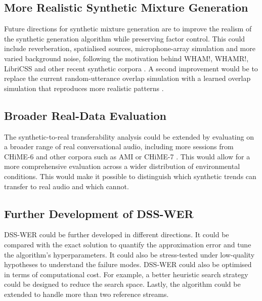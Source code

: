\subsection{More Realistic Synthetic Mixture Generation}
Future directions for synthetic mixture generation are to improve the realism of the synthetic generation algorithm while preserving factor control. This could include reverberation, spatialised sources, microphone-array simulation and more varied background noise, following the motivation behind WHAM!, WHAMR!, LibriCSS and other recent synthetic corpora \citep{wichern2019whamextendingspeechseparation, maciejewski2020whamrnoisyreverberantsinglechannel, chen2020continuousspeechseparationdataset}. A second improvement would be to replace the current random-utterance overlap simulation with a learned overlap simulation that reproduces more realistic patterns \citet{yang2022simulatingrealisticspeechoverlaps}.
\subsection{Broader Real-Data Evaluation}
The synthetic-to-real transferability analysis could be extended by evaluating on a broader range of real conversational audio, including more sessions from CHiME-6 and other corpora such as AMI or CHiME-7 \citep{ami-corpus, carletta2005ami, chime6, watanabe2020chime6challengetacklingmultispeakerspeech, chime7}. This would allow for a more comprehensive evaluation across a wider distribution of environmental conditions. This would make it possible to distinguish which synthetic trends can transfer to real audio and which cannot.

\subsection{Further Development of DSS-WER}
DSS-WER could be further developed in different directions. It could be compared with the exact solution to quantify the approximation error and tune the algorithm's hyperparameters. It could also be stress-tested under low-quality hypotheses to understand the failure modes. DSS-WER could also be optimised in terms of computational cost. For example, a better heuristic search strategy could be designed to reduce the search space. Lastly, the algorithm could be extended to handle more than two reference streams.

